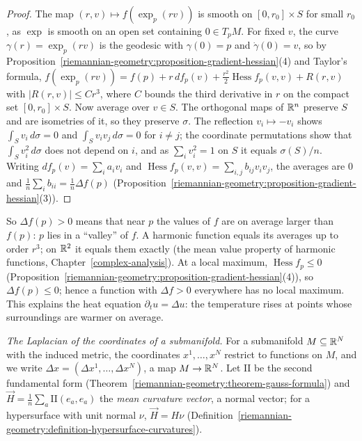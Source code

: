 \begin{proof}
The map $(r, v) \mapsto f(\exp_p(rv))$ is smooth on $[0, r_0] \times S$ for small $r_0$, as $\exp$ is smooth on an open set containing $0 \in T_pM$. For fixed $v$, the curve
$\gamma(r) = \exp_p(rv)$ is the geodesic with $\gamma(0) = p$ and $\dot\gamma(0) = v$, so by Proposition~\ref{riemannian-geometry:proposition-gradient-hessian}(4) and Taylor's formula,
$f(\exp_p(rv)) = f(p) + r\,df_p(v) + \frac{r^2}2\operatorname{Hess}f_p(v, v) + R(r, v)$ with $|R(r, v)| \leq Cr^3$, where $C$ bounds the third derivative in $r$ on the compact set
$[0, r_0] \times S$. Now average over $v \in S$. The orthogonal maps of $\mathbb{R}^n$ preserve $S$ and are isometries of it, so they preserve $\sigma$. The reflection
$v_i \mapsto -v_i$ shows $\int_Sv_i\,d\sigma = 0$ and $\int_Sv_iv_j\,d\sigma = 0$ for $i \neq j$; the coordinate permutations show that $\int_Sv_i^2\,d\sigma$ does not depend on $i$, and as
$\sum_iv_i^2 = 1$ on $S$ it equals $\sigma(S)/n$. Writing $df_p(v) = \sum_ia_iv_i$ and $\operatorname{Hess}f_p(v, v) = \sum_{i,j}b_{ij}v_iv_j$, the averages are $0$ and
$\frac1n\sum_ib_{ii} = \frac1n\Delta f(p)$ (Proposition~\ref{riemannian-geometry:proposition-gradient-hessian}(3)).
\end{proof}

So $\Delta f(p) > 0$ means that near $p$ the values of $f$ are on average larger than $f(p)$: $p$ lies in a ``valley'' of $f$. A harmonic function equals its averages up to order
$r^3$; on $\mathbb{R}^2$ it equals them exactly (the mean value property of harmonic functions, Chapter~\ref{complex-analysis}). At a local maximum, $\operatorname{Hess}f_p \leq 0$ (Proposition~\ref{riemannian-geometry:proposition-gradient-hessian}(4)),
so $\Delta f(p) \leq 0$; hence a function with $\Delta f > 0$ everywhere has no local maximum. This explains the heat equation $\partial_tu = \Delta u$: the temperature rises at points
whose surroundings are warmer on average.

\emph{The Laplacian of the coordinates of a submanifold.} For a submanifold $M \subseteq \mathbb{R}^N$ with the induced metric, the coordinates $x^1, \ldots, x^N$ restrict to functions on $M$,
and we write $\Delta x = (\Delta x^1, \ldots, \Delta x^N)$, a map $M \to \mathbb{R}^N$. Let $\mathrm{II}$ be the second fundamental form (Theorem~\ref{riemannian-geometry:theorem-gauss-formula}) and
$\vec{H} = \frac1n\sum_a\mathrm{II}(e_a, e_a)$ the \emph{mean curvature vector}, a normal vector; for a hypersurface with unit normal $\nu$, $\vec{H} = H\nu$
(Definition~\ref{riemannian-geometry:definition-hypersurface-curvatures}).

